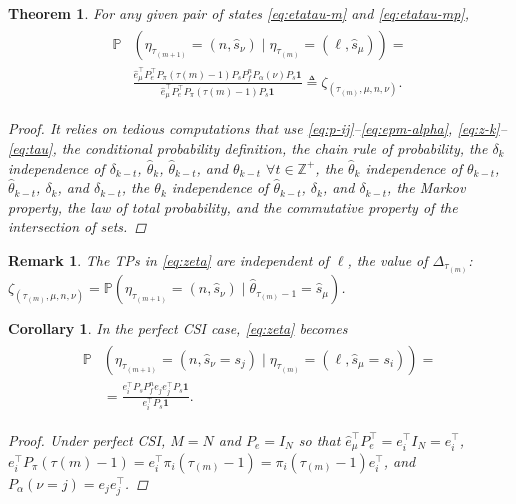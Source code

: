 \documentclass[journal,twoside,web]{ieeecolor}
\newtheorem{theorem}{Theorem}
\newtheorem{corollary}{Corollary}[theorem]
\newtheorem{remark}{Remark}
\begin{document}
\begin{theorem}\label{theorem:eta-probability}
    For any given pair of states \eqref{eq:etatau-m} and \eqref{eq:etatau-mp}, 
    \begin{align}\label{eq:zeta}
    \begin{aligned}
        \mathbb{P}&(\eta_{\tau_{(m+1)}}^{} = (n,\hat{s}_{\nu}) \mid \eta_{\tau_{(m)}}^{} = (\ell,\hat{s}_{\mu})) = \\
        & \frac{\hat{e}_{\mu}^{\top} P_{e}^{\top} P_{\pi}(\tau{(m)}-1) P_{s} P_{f}^{n} P_{\alpha}(\nu) P_{s} \mathbf{1}}{\hat{e}_{\mu}^{\top} P_{e}^{\top} P_{\pi}(\tau{(m)}-1) P_{s}\mathbf{1}} \triangleq \zeta_{(\tau_{(m)},\mu,n,\nu)}.
    \end{aligned}        
    \end{align}
\begin{proof}
    It relies on tedious computations that use \eqref{eq:p-ij}--\eqref{eq:epm-alpha}, \eqref{eq:z-k}--\eqref{eq:tau}, the conditional probability definition, the chain rule of probability, the $\delta_{k}$ independence of $\delta_{k-t}$, $\hat{\theta}_{k}$, $\hat{\theta}_{k-t}$, and $\theta_{k-t}$ $\forall t \in \mathbb{Z}^{+}$, the $\hat{\theta}_{k}$ independence of $\theta_{k-t}$, $\hat{\theta}_{k-t}$, $\delta_k$, and $\delta_{k-t}$,
    the $\theta_{k}$ independence of $\hat{\theta}_{k-t}$, $\delta_{k}$, and $\delta_{k-t}$,
    the Markov property, the law of total probability, 
    and the commutative property of the intersection of sets.
\end{proof}
\end{theorem}
\begin{remark}\label{rem:zeta-l-independence}
The TPs in \eqref{eq:zeta} are independent of $\ell$, the value of $\mathit{\Delta}_{\tau_{(m)}}$: $\zeta_{(\tau_{(m)},\mu,n,\nu)} = \mathbb{P}(\eta_{\tau_{(m+1)}}^{} \!= (n,\hat{s}_{\nu}) \mid \hat{\theta}_{\tau_{(m)}-1} \!= \hat{s}_{\mu})$.
\end{remark}
\begin{corollary}\label{corollary:eta}
In the \emph{perfect CSI} case, \eqref{eq:zeta} becomes
\begin{align}\label{eq:zeta-perfect-csi}
    \begin{aligned}
        \mathbb{P}&(\eta_{\tau_{(m+1)}}^{} = (n,\hat{s}_{\nu}=s_j) \mid \eta_{\tau_{(m)}}^{} = (\ell,\hat{s}_{\mu}=s_i)) = \\
        &= \frac{e_{i}^{\top} P_{s} P_{f}^{n} e_{j}e_{j}^{\top} P_{s} \mathbf{1}}{e_{i}^{\top} P_{s}\mathbf{1}}.
    \end{aligned}
\end{align}
\begin{proof}
    Under perfect CSI, $M=N$ and $P_e = I_{N}$ so that $\hat{e}_{\mu}^{\top} P_{e}^{\top} = e_{i}^{\top} I_{N} = e_{i}^{\top}$, $e_{i}^{\top} P_{\pi}(\tau{(m)}-1)=e_{i}^{\top}\pi_{i}(\tau_{(m)}-1)=\pi_{i}(\tau_{(m)}-1)e_{i}^{\top}$, and $P_{\alpha}(\nu=j)=e_{j}e_{j}^{\top}$.
\end{proof}
\end{corollary}
\end{document}
